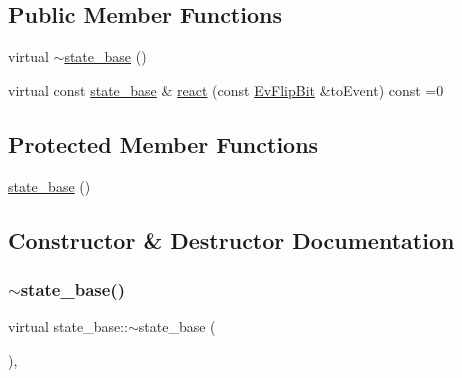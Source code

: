 \subsection*{Public Member Functions}
\begin{DoxyCompactItemize}
\item 
virtual \mbox{\hyperlink{classstate__base_ae853da25b3f60614225781e5d91f9744}{$\sim$state\+\_\+base}} ()
\item 
virtual const \mbox{\hyperlink{classstate__base}{state\+\_\+base}} \& \mbox{\hyperlink{classstate__base_a2ee5b06850f92dd17ff82907bed15308}{react}} (const \mbox{\hyperlink{struct_ev_flip_bit}{Ev\+Flip\+Bit}} \&to\+Event) const =0
\end{DoxyCompactItemize}
\subsection*{Protected Member Functions}
\begin{DoxyCompactItemize}
\item 
\mbox{\hyperlink{classstate__base_ac9c7a2faea65fd546ee7aac1eb36dbe5}{state\+\_\+base}} ()
\end{DoxyCompactItemize}


\subsection{Constructor \& Destructor Documentation}
\mbox{\label{classstate__base_ae853da25b3f60614225781e5d91f9744}} 
\subsubsection{\texorpdfstring{$\sim$state\+\_\+base()}{~state\_base()}}
{\footnotesize\ttfamily virtual state\+\_\+base\+::$\sim$state\+\_\+base (\begin{DoxyParamCaption}{ }\end{DoxyParamCaption})\hspace{0.3cm}{\ttfamily [inline]}, {\ttfamily [virtual]}}

\mbox{\label{classstate__base_ac9c7a2faea65fd546ee7aac1eb36dbe5}} 
